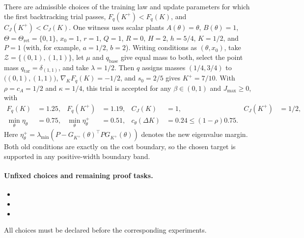 \begin{proposition}
\label{prop:stage2_counterexample}
There are admissible choices of the training law and update parameters for
which the first backtracking trial passes, $F_q(K^+)<F_q(K)$, and
$C_J(K^+)<C_J(K)$. One witness uses scalar plants
$A(\theta)=\theta$, $B(\theta)=1$, $\Theta=\Theta_{\mathrm{ret}}=\{0,1\}$,
$x_0=1$, $r=1$, $Q=1$, $R=0$, $H=2$, $h=5/4$, $K=1/2$, and $P=1$
(with, for example, $a=1/2$, $b=2$). Writing conditions as
$(\theta,x_0)$, take $\mathcal Z=\{(0,1),(1,1)\}$, let $\mu$ and
$q_{\mathrm{base}}$ give equal mass to both, select the point mass
$q_{\mathrm{tar}}=\delta_{(1,1)}$, and take $\lambda=1/2$. Then
$q$ assigns masses $(1/4,3/4)$ to $\big((0,1),(1,1)\big)$,
$\nabla_KF_q(K)=-1/2$, and $s_0=2/5$ gives $K^+=7/10$.
With $\rho=c_A=1/2$ and $\kappa=1/4$, this trial is accepted for any
$\beta\in(0,1)$ and $J_{\max}\ge0$, with
\begin{align}
\label{eq:stage2_counterexample_values}
 F_q(K)&=1.25,& F_q(K^+)&=1.19,& C_J(K)&=1,& C_J(K^+)&=1/2,\\
 \min_\theta\eta_\theta&=0.75,
 &\min_\theta\eta_\theta^+&=0.51,
 &c_\theta(\Delta K)&=0.24\le(1-\rho)0.75.
\end{align}
Here
$\eta_\theta^+=\lambda_{\min}(P-G_{K^+}(\theta)^\top PG_{K^+}(\theta))$
denotes the new eigenvalue margin. Both old conditions
are exactly on the cost boundary, so the chosen target is supported in
any positive-width boundary band.
\end{proposition}

\paragraph{Unfixed choices and remaining proof tasks.}
\begin{itemize}
\item
{}
\item
{}
\item
{}
\end{itemize}
All choices must be declared before the corresponding experiments.

